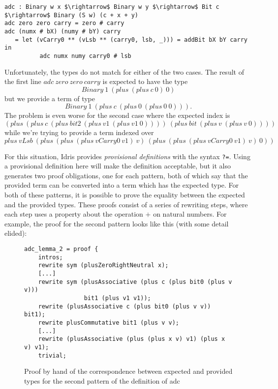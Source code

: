 \begin{lstlisting}
adc : Binary w x $\rightarrow$ Binary w y $\rightarrow$ Bit c $\rightarrow$ Binary (S w) (c + x + y)
adc zero zero carry = zero # carry
adc (numx # bX) (numy # bY) carry
   = let (vCarry0 ** (vLsb ** (carry0, lsb, _))) = addBit bX bY carry in
          adc numx numy carry0 # lsb
\end{lstlisting}

Unfortunately, the types do not match for either of the two cases. 
The result of the first line $adc\ zero\ zero\ carry$ is
expected to have the type\[Binary\ 1\ (plus\ (plus\ c\ 0)\ 0)\] but we
provide a term of type \[Binary\ 1\ (plus\ c\ (plus\ 0\ (plus\ 0\ 0))).\]
The problem is even worse for the second case where the expected index is 
\[(plus\ (plus\ c\ (plus\ bit2\ (plus\ v1\ (plus\ v1\ 0))))\ (plus\ bit\ (plus\ v\ (plus\ v\ 0))))\] while we're trying to provide a term indexed over 
\[plus\ vLsb\ (plus\ (plus\ (plus\ vCarry0\ v1)\ v)\ (plus\ (plus\ (plus\ vCarry0\ v1)\ v)\ 0))\]

For
this situation, Idris provides \emph{provisional definitions} with the 
syntax \texttt{?=}. Using a provisional definition here will make
the definition acceptable, but it also generates two proof obligations, one
for each pattern, both of which say that the provided term can be
converted into a term which has the expected type.  For both of these
patterns, it is possible to prove the equality between the expected and
the provided types. These proofs
consist of a series of rewriting steps, where each step uses a property about the
operation $+$ on natural numbers.  For example, the proof for the second
pattern looks like this (with some detail elided):

\begin{figure}[H]
\figrule
\begin{center}
\begin{lstlisting}
adc_lemma_2 = proof {
    intros;
    rewrite sym (plusZeroRightNeutral x);
    [...]
    rewrite sym (plusAssociative (plus c (plus bit0 (plus v v))) 
                 bit1 (plus v1 v1));
    rewrite (plusAssociative c (plus bit0 (plus v v)) bit1);
    rewrite plusCommutative bit1 (plus v v);
    [...]
    rewrite (plusAssociative (plus (plus x v) v1) (plus x v) v1);
    trivial;
\end{lstlisting}
\end{center}
\caption{Proof by hand of the correspondence between expected and provided types for the second pattern of the definition of adc}
\figrule
\end{figure}


